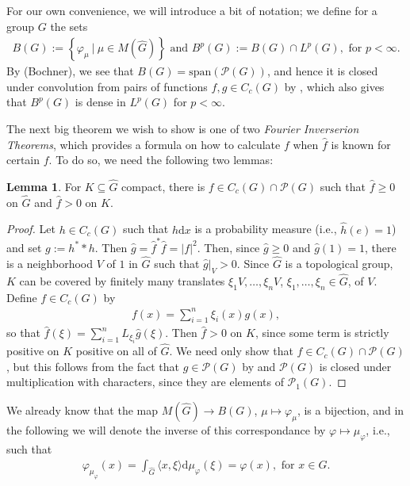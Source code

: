 \documentclass[10pt,twoside,openany,final]{memoir}
\theoremstyle{definition}
\newtheorem{lemma}[theorem]{Lemma}
\theoremstyle{Break}
\newcommand{\G}{\widehat{G}}
\renewcommand{\P}{\mathcal{P}}
\renewcommand{\d}{\mathrm{d}}
\begin{document}
For our own convenience, we will introduce a bit of notation; we define for a group $G$ the sets
\begin{align*}
	B(G):=\left\{ \varphi_\mu \ \big| \ \mu \in M(\G) \right\}\text{  and  }	B^p(G):=B(G) \cap L^p(G), \text{ for } p < \infty.
\end{align*}
By  (Bochner), we see that $B(G)=\mathrm{span}\left( \P(G) \right)$, and hence it is closed under convolution from pairs of functions $f,g \in C_c(G)$ by , which also gives that $B^p(G)$ is dense in $L^p(G)$ for $p <\infty$.

The next big theorem we wish to show is one of two \textit{Fourier Inverserion Theorems}, which provides a formula on how to calculate $f$ when $\widehat{f}$ is known for certain $f$. To do so, we need the following two lemmas:
\begin{lemma}
	For $K \subseteq \G$ compact, there is $f \in C_c(G) \cap \P(G)$ such that $\widehat{f}\geq 0$ on $\G$ and $\widehat{f}>0$ on $K$.
	\label{4.19}
\end{lemma}
\begin{proof}
	Let $h \in C_c(G)$ such that $h \d x$ is a probability measure (i.e., $\widehat{h}(e)=1$) and set $g:=h^* \ast h$. Then $\widehat{g}=\widehat{f}^*\widehat{f}=|f|^2$. Then, since $\widehat{g}\geq 0$ and $\widehat{g}(1)=1$, there is a neighborhood $V$ of $1$ in $\G$ such that $\widehat{g}|_V>0$. Since $\G$ is a topological group, $K$ can be covered by finitely many translates $\xi_1V,\dots,\xi_nV$, $\xi_1,\dots,\xi_n \in \G$, of $V$. Define $f \in C_c(G)$ by
	\begin{align*}
		f(x)=\sum_{i=1}^n \xi_i(x)g(x),
	\end{align*}
	so that $\widehat{f}(\xi)=\sum_{i=1}^nL_{\xi_i}\widehat{g}(\xi)$. Then $\widehat{f}>0$ on $K$, since some term is strictly positive on $K$ positive on all of $\G$. We need only show that $f \in C_c(G) \cap \P(G)$, but this follows from the fact that $g \in \P(G)$ by  and $\P(G)$ is closed under multiplication with characters, since they are elements of $\P_1(G)$.
\end{proof}
We already know that the map $M(\G) \to B(G)$, $\mu \mapsto \varphi_\mu$, is a bijection, and in the following we will denote the inverse of this correspondance by $\varphi \mapsto \mu_\varphi$, i.e., such that
\begin{align*}
	\varphi_{\mu_\varphi}(x)=\int_{\G} \langle x,\xi\rangle \d \mu_\varphi(\xi)=\varphi(x), \text{ for } x \in G.
\end{align*}
\end{document}
